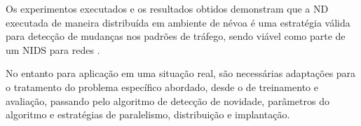 Os experimentos executados e os resultados obtidos demonstram que a \acf{ND}
executada de maneira distribuída em ambiente de névoa é uma estratégia
válida para detecção de mudanças nos padrões de tráfego, sendo viável como parte
de um \acf{NIDS} para redes \iot.

No entanto para aplicação em uma situação real, são necessárias adaptações para
o tratamento do problema específico abordado,
desde o \dataset de treinamento e avaliação, passando pelo algoritmo de detecção
de novidade, parâmetros do algoritmo e estratégias de paralelismo, distribuição
e implantação.
